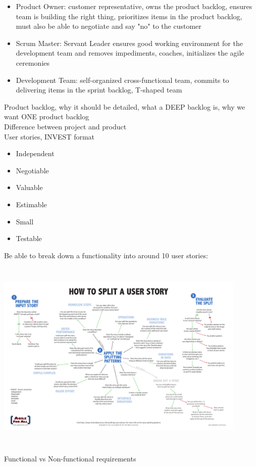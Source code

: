 \documentclass[10pt]{article}
\begin{document}
\begin{itemize}
\item Product Owner: customer representative, owns the product backlog, ensures team is building the right thing, prioritizes items in the product backlog, must also be able to negotiate and say "no" to the customer
\item Scrum Master: Servant Leader ensures good working environment for the development team and removes impediments, coaches, initializes the agile ceremonies
\item Development Team: self-organized cross-functional team, commits to delivering items in the sprint backlog, T-shaped team
\end{itemize}
Product backlog, why it should be detailed, what a DEEP backlog is, why we want ONE product backlog\\
Difference between project and product\\
User stories, INVEST format
\begin{itemize}
\item Independent
\item Negotiable
\item Valuable
\item Estimable
\item Small
\item Testable
\end{itemize}
Be able to break down a functionality into around 10 user stories:\\
\includegraphics[width=12cm, height=10cm]{userstories-flowchart}\\
Functional vs Non-functional requirements
\end{document}
